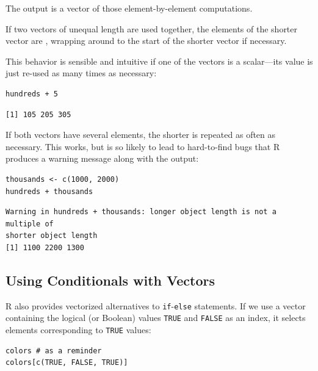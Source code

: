 The output is a vector of those element-by-element computations. 

If two vectors of unequal length are used together,
the elements of the shorter vector are ,
wrapping around to the start of the shorter vector if necessary.

This behavior is sensible and intuitive if one of the vectors is a scalar---its value is just re-used as many times as necessary:

\begin{lstlisting}
hundreds + 5
\end{lstlisting}

\begin{lstlisting}
[1] 105 205 305
\end{lstlisting}

If both vectors have several elements,
the shorter is repeated as often as necessary.
This works,
but is so likely to lead to hard-to-find bugs that R produces a warning message along with the output:

\begin{lstlisting}
thousands <- c(1000, 2000)
hundreds + thousands
\end{lstlisting}

\begin{lstlisting}
Warning in hundreds + thousands: longer object length is not a multiple of
shorter object length
[1] 1100 2200 1300
\end{lstlisting}


\subsection{Using Conditionals with Vectors}

R also provides vectorized alternatives to \texttt{if}-\texttt{else} statements.
If we use a vector containing the logical (or Boolean) values \texttt{TRUE} and \texttt{FALSE} as an index,
it selects elements corresponding to \texttt{TRUE} values:

\begin{lstlisting}
colors # as a reminder
colors[c(TRUE, FALSE, TRUE)]
\end{lstlisting}

